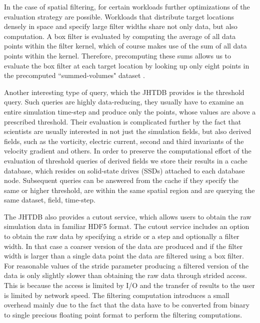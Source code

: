 \documentclass[10pt,twocolumn]{article}
\begin{document}
In the case of spatial filtering, for certain workloads further optimizations of the evaluation strategy are possible. Workloads that distribute target locations
densely in space and specify large filter widths share not only data, but also computation. A box filter is evaluated by computing the average of all data
points within the filter kernel, which of course makes use of the sum of all data points within the kernel. Therefore, precomputing these sums allows us to
evaluate the box filter at each target location by looking up only eight points in the precomputed ``summed-volumes" dataset \cite{KanovSC12}.

Another interesting type of query, which the JHTDB provides is the threshold query. Such queries are highly data-reducing, they usually have to examine an
entire simulation time-step and produce only the points, whose values are above a prescribed threshold. Their evaluation is complicated further by the fact
that scientists are usually interested in not just the simulation fields, but also derived fields, such as the vorticity, electric current, second and third invariants
of the velocity gradient and others. In order to preserve the computational effort of the evaluation of threshold queries of derived fields we store their results
in a cache database, which resides on solid-state drives (SSDs) attached to each database node. Subsequent queries can be answered from the cache
if they specify the same or higher threshold, are within the same spatial region and are querying the same dataset, field, time-step.

The JHTDB also provides a cutout service, which allows users to obtain the raw simulation data in familiar HDF5 format. The cutout service includes an
option to obtain the raw data by specifying a stride or a step and optionally a filter width. 
In that case a coarser version of the data are produced and if the filter width is larger than a single data point the data are filtered using a box filter. 
For reasonable values of the stride parameter producing a filtered version of the data is only slightly slower than obtaining the raw data through strided access.  
This is because the access is limited by I/O and the transfer of results to the user is limited by network speed. 
The filtering computation introduces a small overhead mainly due to the fact that the data have to be converted
from binary to single precious floating point format to perform the filtering computations.
\end{document}
